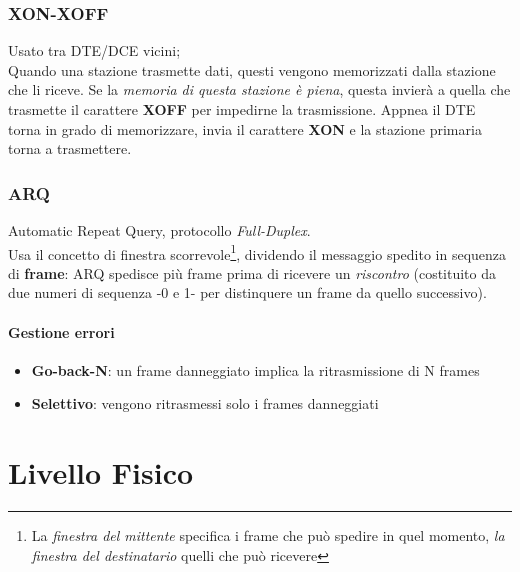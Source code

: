 \documentclass[a4paper,11pt]{article}
\begin{document}
\subsubsection{XON-XOFF}
Usato tra DTE/DCE vicini; \\Quando una stazione trasmette dati, questi vengono memorizzati dalla stazione che li riceve. Se la \textit{memoria di questa stazione è piena}, questa invierà a quella che trasmette il carattere \textbf{XOFF} per impedirne la trasmissione. Appnea il DTE torna in grado di memorizzare, invia il carattere \textbf{XON} e la stazione primaria torna a trasmettere.
\subsubsection{ARQ}
Automatic Repeat Query, protocollo \textit{Full-Duplex}.\\
Usa il concetto di finestra scorrevole\footnote{La \textit{finestra del mittente} specifica i frame che può spedire in quel momento, \textit{la finestra del destinatario} quelli che può ricevere}, dividendo il messaggio spedito in sequenza di \textbf{frame}: ARQ spedisce più frame prima di ricevere un \textit{riscontro} (costituito da due numeri di sequenza -0 e 1- per distinquere un frame da quello successivo).\\
\paragraph{Gestione errori}
\begin{itemize}
\item\textbf{Go-back-N}: un frame danneggiato implica la ritrasmissione di N frames
\item\textbf{Selettivo}: vengono ritrasmessi solo i frames danneggiati
\end{itemize}

\newpage
\section{Livello Fisico}
\end{document}
